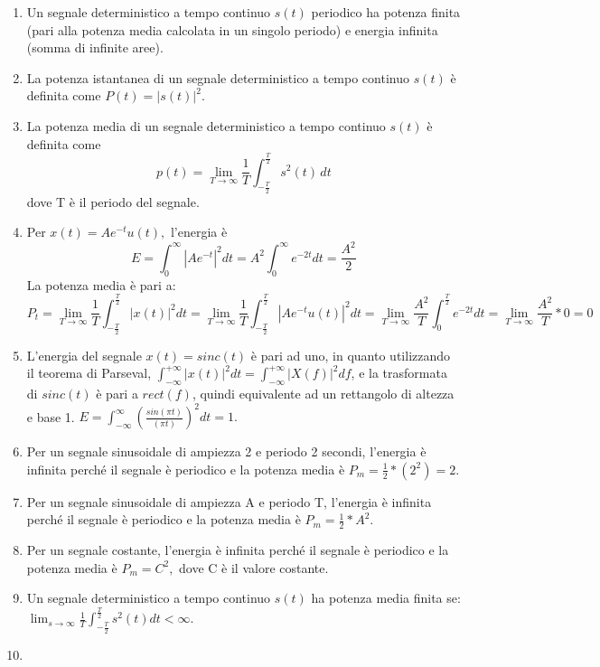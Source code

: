 \documentclass[
  paper=a4,
  ,captions=tableheading
]{scrartcl}
\providecommand{\tightlist}{%
  \setlength{\itemsep}{0pt}\setlength{\parskip}{0pt}}
\begin{document}
\begin{enumerate}
\def\labelenumi{\arabic{enumi}.}
\tightlist
\item
  Un segnale deterministico a tempo continuo \(s(t)\) periodico ha
  potenza finita (pari alla potenza media calcolata in un singolo
  periodo) e energia infinita (somma di infinite aree).
\item
  La potenza istantanea di un segnale deterministico a tempo continuo
  \(s(t)\) è definita come \(P(t) = |s(t)|^2\).
\item
  La potenza media di un segnale deterministico a tempo continuo
  \(s(t)\) è definita come \[
  p(t) = \lim_{T\to\infty} \frac{1}{T} \int_{-\frac{T}{2}}^{\frac{T}{2}} s^2(t) \,dt
  \] dove T è il periodo del segnale.
\item
  Per \(x(t) = Ae^{-t}u(t),\) l'energia è \[
  E = \int_{0}^{\infty} |Ae^{-t}|^2 dt = A^2 \int_0^\infty e^{-2t} dt = \frac{A^2}{2}
  \] La potenza media è pari a: \[
  \displaystyle P_t = \lim_{T \to \infty} \frac{1}{T} \int_{-\frac{T}{2}}^{\frac{T}{2}} |x(t)|^2 dt = \lim_{T \to \infty} \frac{1}{T} \int_{-\frac{T}{2}}^{\frac{T}{2}} |A e^{-t} u(t)|^2 dt =  \lim_{T \to \infty} \frac{A^2}{T} \int_{0}^{\frac{T}{2}} e^{-2t} dt = \lim_{T \to \infty} \frac{A^2}{T}*0 = 0
  \]
\item
  L'energia del segnale \(x(t) = sinc(t)\) è pari ad uno, in quanto
  utilizzando il teorema di Parseval,
  \(\displaystyle\int_{-\infty}^{+\infty}|x(t)|^2dt = \int_{-\infty}^{+\infty}|X(f)|^2df\),
  e la trasformata di \(sinc(t)\) è pari a \(rect(f)\), quindi
  equivalente ad un rettangolo di altezza e base 1.
  \(\displaystyle E = \int_{-\infty}^\infty (\frac{sin(\pi t)}{( \pi t)})^2 dt = 1.\)
\item
  Per un segnale sinusoidale di ampiezza 2 e periodo 2 secondi,
  l'energia è infinita perché il segnale è periodico e la potenza media
  è \(P_m = \frac{1}{2} * (2^2) = 2.\)
\item
  Per un segnale sinusoidale di ampiezza A e periodo T, l'energia è
  infinita perché il segnale è periodico e la potenza media è
  \(P_m = \frac{1}{2} * A^2\).
\item
  Per un segnale costante, l'energia è infinita perché il segnale è
  periodico e la potenza media è \(P_m = C^2,\) dove C è il valore
  costante.
\item
  Un segnale deterministico a tempo continuo \(s(t)\) ha potenza media
  finita se:
  \(\displaystyle \lim_{s\to\infty} \frac{1}{T} \int_{-\frac{T}{2}}^{\frac{T}{2}} s^2(t)dt < \infty\).
\item

\end{enumerate}
\end{document}
